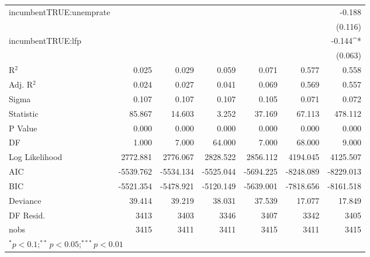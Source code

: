\begin{table}[!htbp]
\begin{adjustbox}{width=\textwidth}
\begin{tabular}{l D{.}{.}{5.6} D{.}{.}{5.6} D{.}{.}{5.6} D{.}{.}{5.6} D{.}{.}{5.6} D{.}{.}{5.6}}
incumbentTRUE:unemprate & & & & & & -0.188 \\ & & & & & & (0.116) \\
incumbentTRUE:lfp & & & & & & -0.144^{*} \\ & & & & & & (0.063) \\
\midrule
R$^2$ & 0.025 & 0.029 & 0.059 & 0.071 & 0.577 & 0.558 \\
Adj. R$^2$ & 0.024 & 0.027 & 0.041 & 0.069 & 0.569 & 0.557 \\
Sigma & 0.107 & 0.107 & 0.107 & 0.105 & 0.071 & 0.072 \\
Statistic & 85.867 & 14.603 & 3.252 & 37.169 & 67.113 & 478.112 \\
P Value & 0.000 & 0.000 & 0.000 & 0.000 & 0.000 & 0.000 \\
DF & 1.000 & 7.000 & 64.000 & 7.000 & 68.000 & 9.000 \\
Log Likelihood & 2772.881 & 2776.067 & 2828.522 & 2856.112 & 4194.045 & 4125.507 \\
AIC & -5539.762 & -5534.134 & -5525.044 & -5694.225 & -8248.089 & -8229.013 \\
BIC & -5521.354 & -5478.921 & -5120.149 & -5639.001 & -7818.656 & -8161.518 \\
Deviance & 39.414 & 39.219 & 38.031 & 37.539 & 17.077 & 17.849 \\
DF Resid. & 3413 & 3403 & 3346 & 3407 & 3342 & 3405 \\
nobs & 3415 & 3411 & 3411 & 3415 & 3411 & 3415 \\
\bottomrule
{}
\end{tabular}
\end{adjustbox}

\label{table:coefficients}

\end{table}

